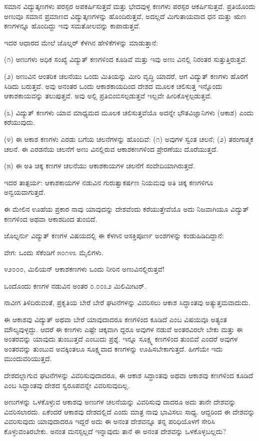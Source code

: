 ಸಮಾನ ವಿದ್ಯುತ್ಕಣಗಳು ಪರಸ್ಪರ ಅಪಕರ್ಷಿಸುತ್ತವೆ ಮತ್ತು ಭೇದವುಳ್ಳ ಕಣಗಳು ಪರಸ್ಪರ ಆಕರ್ಷಿಸುತ್ತವೆ. ಪ್ರತಿಯೊಂದು ಅಣುವೂ ಸಮಾನ ಪ್ರಮಾಣದ ವಿದ್ಯುತ್ಕಣಗಳನ್ನು ಹೊಂದಿರುತ್ತವೆ, ಅದಲ್ಲದೆ ಮಿಗುತಾಯವಾದ ಧನ ಮತ್ತು ಋಣ ಕಣಗಳನ್ನೂ ಹೊಂದಿದ್ದು ಇವು ಸಮತೋಲವನ್ನು ಕಾಪಾಡುತ್ತವೆ.

ಇದರ ಆಧಾರದ ಮೇಲೆ ಜೊಲ್ನರ್ ಕೆಳಗಿನ ಹೇಳಿಕೆಗಳನ್ನು ಮಾಡುತ್ತಾನೆ:

(೧) ಅಣುಗಳು ಅಧಿಕ ಸಂಖ್ಯೆ ವಿದ್ಯುತ್ ಕಣಗಳಿಂದ ಕೂಡಿವೆ ಮತ್ತು ಇವು ಅಣು ವಿನಲ್ಲಿ ನಿರಂತರ ಸುತ್ತುತ್ತಿರುತ್ತವೆ.

(೨) ಅಣುವಿನ ಆಂತರಿಕ ಚಲನೆಯು ಒಂದು ಮಿತಿಯನ್ನು ಮೀರಿ ವೃದ್ಧಿ ಯಾದರೆ, ಆಗ ವಿದ್ಯುತ್ ಕಣಗಳು ಹೊರಗೆ ಸಿಡಿದು ಬರುತ್ತವೆ. ಅವು ಅನಂತರ ಒಂದು ಆಕಾಶಕಾಯದಿಂದ ದೇಶದ  ಮೂಲಕ ಚಲಿಸುತ್ತ ಇನ್ನೊಂದು ಆಕಾಶಕಾಯವನ್ನು ತಲುಪುತ್ತವೆ. ಅವು ಅಲ್ಲಿ ಪ್ರತಿಬಿಂಬಿಸಲ್ಪಡುತ್ತವೆ ಇಲ್ಲವೇ ಹೀರಿಕೊಳ್ಳಲ್ಪಡುತ್ತವೆ.

(೩) ವಿದ್ಯುತ್ ಕಣಗಳು ಯಾವ ಮಾಧ್ಯಮದ ಮೂಲಕ ಚಲಿಸುತ್ತವೆಯೊ ಅದನ್ನೇ ಭೌತವಿಜ್ಞಾನಿಗಳು  (ಆಕಾಶ) ಎಂದು ಕರೆಯುವುದು.

(೪) ಈ ಆಕಾಶ ಕಣಗಳು ಎರಡು ಬಗೆಯ ಚಲನೆಗಳನ್ನು ಹೊಂದಿವೆ: (೧) ಅವುಗಳ ಸ್ವಂತ ಚಲನೆ; (೨) ತರಂಗಾತ್ಮಕ ಚಲನೆ. ಈ ಎರಡನೆಯ ಚಲನೆಗೆ ಅಣು ವಿನಲ್ಲಿರುವ ಆಕಾಶಕಣಗಳಿಂದ ಪ್ರೇರಣೆಯು ದೊರೆಯುತ್ತದೆ.

(೫) ಈ ಅತಿ ಚಿಕ್ಕ ಕಣಗಳ ಚಲನೆಯು ಆಕಾಶಕಾಯಗಳ ಚಲನೆಗೆ ಸಂವೇದಿಯಾಗಿರುತ್ತದೆ.

ಇದರ ತಾತ್ಪರ್ಯ: ಆಕಾಶಕಾಯಗಳ ನಡುವಿನ ಗುರುತ್ವಾಕರ್ಷಣ ನಿಯಮವು ಅತಿ ಚಿಕ್ಕ ಕಣಗಳಿಗೂ ಅನ್ವಯವಾಗುತ್ತದೆ.

ಈ ಮೇಲಿನ ಊಹೆಯ ಪ್ರಕಾರ ನಾವು ಯಾವುದನ್ನು ದೇಶವೆಂದು  ಕರೆಯುತ್ತೇವೆಯೊ ಅದು ನಿಜವಾಗಿಯೂ ವಿದ್ಯುತ್ ಕಣಗಳಿಂದ ಅಥವಾ ಆಕಾಶದಿಂದ ತುಂಬಿದೆ.

ಜೊಲ್ನರ್ನು ವಿದ್ಯುತ್ ಕಣಗಳ ವಿಷಯದಲ್ಲಿ ಈ ಕೆಳಗಿನ ಆಸಕ್ತಿಪೂರ್ಣ ಅಂಶಗಳನ್ನು ಕಂಡುಹಿಡಿದಿದ್ದಾನೆ:

ವೇಗ: ಒಂದು ಸೆಕೆಂಡಿಗೆ ೫೦೧೪೩ ಮೈಲಿಗಳು.

೪೨೦೦೦, ಮಿಲಿಯನ್ ಆಕಾಶಕಣಗಳು ಒಂದು ನೀರಿನ ಅಣುವಿನಲ್ಲಿರುತ್ತವೆ!

ಒಂದೊಂದು ಕಣಗಳ ನಡುವಿನ ಅಂತರ ೦.೦೦೩೨ ಮಿಲಿಮೀಟರ್.

ನಾವೀಗ ತಿಳಿದಿರುವಂತೆ, ಪ್ರಕೃತಿಯ ಬೇರೆ ಬೇರೆ ಘಟನೆಗಳನ್ನು ವಿವರಿಸಲು ಆಕಾಶ ಸಿದ್ಧಾಂತವು ಅತ್ಯುತ್ತಮವಾದುದು.

ಈ ಆಕಾಶವು ವಿದ್ಯುತ್ ಅಥವಾ ಬೇರೆ ಯಾವುದಾದರೂ ಕಣಗಳಿಂದ ಕೂಡಿದೆ ಎಂಬ ವಿಷಯವೂ ಅತ್ಯಂತ ಮೌಲ್ಯವುಳ್ಳದ್ದು. ಆದರೆ ಈ ಕಣಗಳು ಎಷ್ಟೇ ಚಿಕ್ಕವಾಗಿ ದ್ದರೂ ಅವುಗಳ ನಡುವೆ ಅಂತರವಿರಲೇ ಬೇಕು ಮತ್ತು ಈ ಅಂತರವನ್ನು ಯಾವುದು ತುಂಬುತ್ತದೆ ಎಂಬುದು ಪ್ರಶ್ನೆ. ಇನ್ನೂ ಸೂಕ್ಷ್ಮ ಕಣಗಳಿಂದ ತುಂಬಿವೆ ಎಂದರೆ ಅವುಗಳ ಅಂತರವನ್ನು ತುಂಬುವ ಅವಕ್ಕಿಂತಲೂ ಸೂಕ್ಷ್ಮವಾದ ಕಣಗಳನ್ನು ಊಹಿಸಬೇಕಾಗುತ್ತದೆ. ಹೀಗೆಯೇ ಇದು ಮುಂದುವರಿಯುತ್ತದೆ.

ದೇಶದಲ್ಲಾಗುವ ಘಟನೆಗಳನ್ನು ವಿವರಿಸುವುದಾದರೂ, ಈ ಆಕಾಶ ಸಿದ್ಧಾಂತವು ಅಥವಾ ಆಕಾಶವು ಕಣಗಳಿಂದ ಕೂಡಿದೆ ಎಂಬ ಸಿದ್ಧಾಂತವು ದೇಶದ ಸ್ವರೂಪವನ್ನೇ ವಿವರಿಸುವುದಿಲ್ಲ.

ಅಣುಗಳನ್ನು ಒಳಕೊಳ್ಳುವ ಆಕಾಶವು ಅಣುಗಳ ಚಲನೆಯನ್ನು ವಿವರಿಸುವು ದಾದರೂ ಅದು ತಾನೇ ದೇಶವನ್ನು ವಿವರಿಸಲಾರದು. ಏಕೆಂದರೆ ಆಕಾಶವು ದೇಶದಲ್ಲಿದೆ ಎಂದು ಮಾತ್ರ ನಾವು ಭಾವಿಸಲು ಸಾಧ್ಯ. ಆದ್ದರಿಂದ ಈ ದೇಶವನ್ನು ವಿವರಿಸುವುದು ಯಾವುದಾದರೂ ಇದ್ದರೆ ಅದು ಈ ಅನಂತ ದೇಶವನ್ನೂ ತನ್ನ ಪರಿಧಿಯೊಳಗೆ ಸೇರಿಸಿ ಕೊಳ್ಳುವಂತಿರಬೇಕು. ಅನಂತ ಮನಸ್ಸಲ್ಲದೆ ಇನ್ನಾವುದು ತಾನೆ ಈ ಅನಂತ ದೇಶವನ್ನು ಒಳಕೊಳ್ಳಬಲ್ಲದು?

